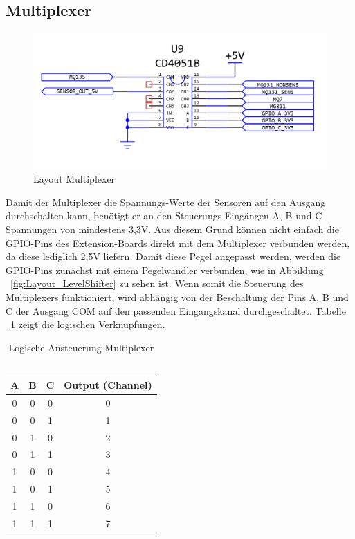\subsection{Multiplexer}\label{subsec:Multiplexer}
\begin{figure}[H]
	\includegraphics[width=\textwidth]{images/Layout_Multiplexer.png}	
	\caption{Layout Multiplexer}
	\label{fig:Layout_Multiplexer}
\end{figure}
Damit der Multiplexer die Spannungs-Werte der Sensoren auf den Ausgang durchschalten kann, benötigt er an den Steuerungs-Eingängen A, B und C Spannungen von mindestens 3,3V. Aus diesem Grund können nicht einfach die \acs{GPIO}-Pins des Extension-Boards direkt mit dem Multiplexer verbunden werden, da diese lediglich 2,5V liefern. Damit diese Pegel angepasst werden, werden die \acs{GPIO}-Pins zunächst mit einem Pegelwandler verbunden, wie in Abbildung ~\ref{fig:Layout_LevelShifter} zu sehen ist.
\newline
Wenn somit die Steuerung des Multiplexers funktioniert, wird abhängig von der Beschaltung der Pins A, B und C der Ausgang COM auf den passenden Eingangskanal durchgeschaltet. Tabelle ~\ref{tab:MultiplexerLogic} zeigt die logischen Verknüpfungen.
\begin{table}[H]
	\begin{center}
			\begin{tabular}{|c|c|c|c|}
				\hline
				A & B & C & Output (Channel)  \\ \hline \hline
				
				0 & 0 & 0 & 0 \\ \hline 
				0 & 0 & 1 & 1 \\ \hline 
				0 & 1 & 0 & 2 \\ \hline 
				0 & 1 & 1 & 3 \\ \hline 
				1 & 0 & 0 & 4 \\ \hline 
				1 & 0 & 1 & 5 \\ \hline 
				1 & 1 & 0 & 6 \\ \hline 
				1 & 1 & 1 & 7 \\ \hline 							
			\end{tabular}
	\end{center}
	\caption{Logische Ansteuerung Multiplexer ~\cite{DataSheet.CD4051B}}
	\label{tab:MultiplexerLogic}
\end{table}
